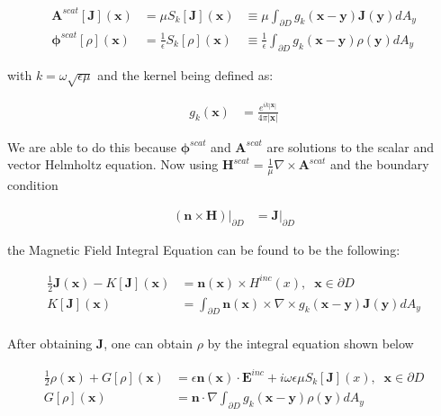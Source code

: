 \documentclass{article}[12pt]
\newcommand{\bvec}[1]{\boldsymbol{#1}}
\begin{document}
	\begin{align*}
	\bvec{A}^{scat}[\bvec{J}](\bvec{x}) &= \mu S_k [\bvec{J}](\bvec{x}) & \equiv \mu \int_{\partial D} g_k(\bvec{x} - \bvec{y}) \bvec{J}(\bvec{y})dA_y \\
	\bvec{\phi}^{scat}[\rho](\bvec{x}) &=\frac{1}{\epsilon} S_k [\rho](\bvec{x}) & \equiv \frac{1}{\epsilon} \int_{\partial D} g_k(\bvec{x} - \bvec{y}) \rho(\bvec{y})dA_y
	\end{align*}
	
	with $k = \omega \sqrt{\epsilon \mu}$ and the kernel being defined as:
	
	\begin{align*}
	g_k(\bvec{x}) &= \frac{e^{i k |\bvec{x}|}}{4 \pi |\bvec{x}|}
	\end{align*}
	
	
	We are able to do this because $\bvec{\phi}^{scat}$ and $\bvec{A}^{scat}$ are solutions to the scalar and vector Helmholtz equation. Now using $\bvec{H}^{scat} = \frac{1}{\mu} \nabla \times \bvec{A}^{scat}$ and the boundary condition
	
	\begin{align*}
	\left.\left(\bvec{n} \times \bvec{H} \right)\right|_{\partial D} &= \left.\bvec{J}\right|_{\partial D}
	\end{align*}
	
	the Magnetic Field Integral Equation can be found to be the following:
	
	\begin{align*}
	\frac{1}{2} \bvec{J}(\bvec{x}) - K[\bvec{J}](\bvec{x}) &= \bvec{n}(\bvec{x}) \times H^{inc}(x), \;\; \bvec{x} \in \partial D \\
	K[\bvec{J}](\bvec{x}) &= \int_{\partial D} \bvec{n}(\bvec{x}) \times \nabla \times g_k(\bvec{x} - \bvec{y}) \bvec{J}(\bvec{y}) dA_y \\
	\end{align*}
	
	After obtaining $\bvec{J}$, one can obtain $\rho$ by the integral equation shown below
	
	\begin{align*}
	\frac{1}{2} \rho(\bvec{x}) + G[\rho](\bvec{x}) &= \epsilon \bvec{n}(\bvec{x}) \cdot \bvec{E}^{inc} +  i \omega \epsilon \mu S_k[\bvec{J}](x), \;\; \bvec{x} \in \partial D \\
	G[\rho](\bvec{x}) &= \bvec{n} \cdot \nabla \int_{\partial D} g_k(\bvec{x} - \bvec{y}) \rho(\bvec{y}) dA_y \\
	\end{align*}
	
\end{document}
